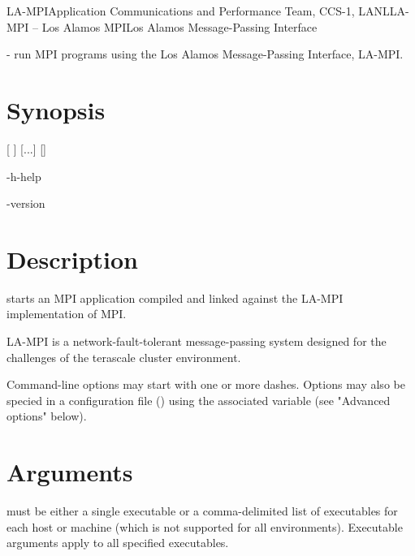 \documentclass[english]{article}
\begin{document}
\begin{Name}{1}{LA-MPI}{Application Communications and Performance Team, CCS-1, LANL}{LA-MPI -- Los Alamos MPI}{Los Alamos Message-Passing Interface}

   - run MPI programs using the Los Alamos Message-Passing Interface, LA-MPI.
\end{Name}

\section{Synopsis}

 [\Bar{} ] 
 [...]  []

 -h\Bar-help

 -version

\section{Description}
 starts an MPI application compiled and linked against the
LA-MPI implementation of MPI.

LA-MPI is a network-fault-tolerant message-passing system designed for
the challenges of the terascale cluster environment.

Command-line options may start with one or more dashes. Options
may also be specied in a configuration file ()
using the associated variable (see "Advanced options" below).

\section{Arguments}
 must be either a single executable or a
comma-delimited list of executables for each host or machine (which is
not supported for all environments). Executable arguments apply to all
specified executables.
\end{document}

